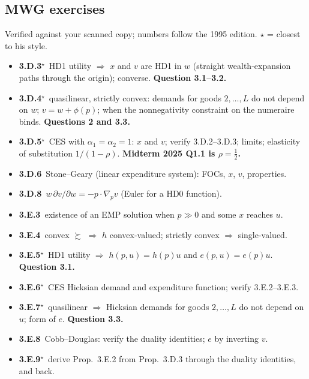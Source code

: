 \documentclass[11pt]{article}
\newcommand{\pref}{\succsim}
\begin{document}
\subsection{MWG exercises}
\begin{todo}{Verified against your scanned copy; numbers follow the 1995 edition. $\star$ = closest to his style.}
\begin{itemize}
\item \textbf{3.D.3}$^\star$\ HD1 utility $\Rightarrow$ $x$ and $v$ are HD1 in $w$ (straight wealth-expansion paths through the origin); converse. \textbf{Question 3.1--3.2.}
\item \textbf{3.D.4}$^\star$\ quasilinear, strictly convex: demands for goods $2,\dots,L$ do not depend on $w$; $v=w+\phi(p)$; when the nonnegativity constraint on the numeraire binds. \textbf{Questions 2 and 3.3.}
\item \textbf{3.D.5}$^\star$\ CES with $\alpha_1=\alpha_2=1$: $x$ and $v$; verify 3.D.2--3.D.3; limits; elasticity of substitution $1/(1-\rho)$. \textbf{Midterm 2025 Q1.1 is $\rho=\tfrac12$.}
\item \textbf{3.D.6}\ Stone--Geary (linear expenditure system): FOCs, $x$, $v$, properties.
\item \textbf{3.D.8}\ $w\,\partial v/\partial w=-p\cdot\nabla_pv$ (Euler for a HD0 function).
\item \textbf{3.E.3}\ existence of an EMP solution when $p\gg0$ and some $x$ reaches $u$.
\item \textbf{3.E.4}\ convex $\pref$ $\Rightarrow$ $h$ convex-valued; strictly convex $\Rightarrow$ single-valued.
\item \textbf{3.E.5}$^\star$\ HD1 utility $\Rightarrow$ $h(p,u)=h(p)u$ and $e(p,u)=e(p)u$. \textbf{Question 3.1.}
\item \textbf{3.E.6}$^\star$\ CES Hicksian demand and expenditure function; verify 3.E.2--3.E.3.
\item \textbf{3.E.7}$^\star$\ quasilinear $\Rightarrow$ Hicksian demands for goods $2,\dots,L$ do not depend on $u$; form of $e$. \textbf{Question 3.3.}
\item \textbf{3.E.8}\ Cobb--Douglas: verify the duality identities; $e$ by inverting $v$.
\item \textbf{3.E.9}$^\star$\ derive Prop.~3.E.2 from Prop.~3.D.3 through the duality identities, and back.
\end{itemize}
\end{todo}
\end{document}
